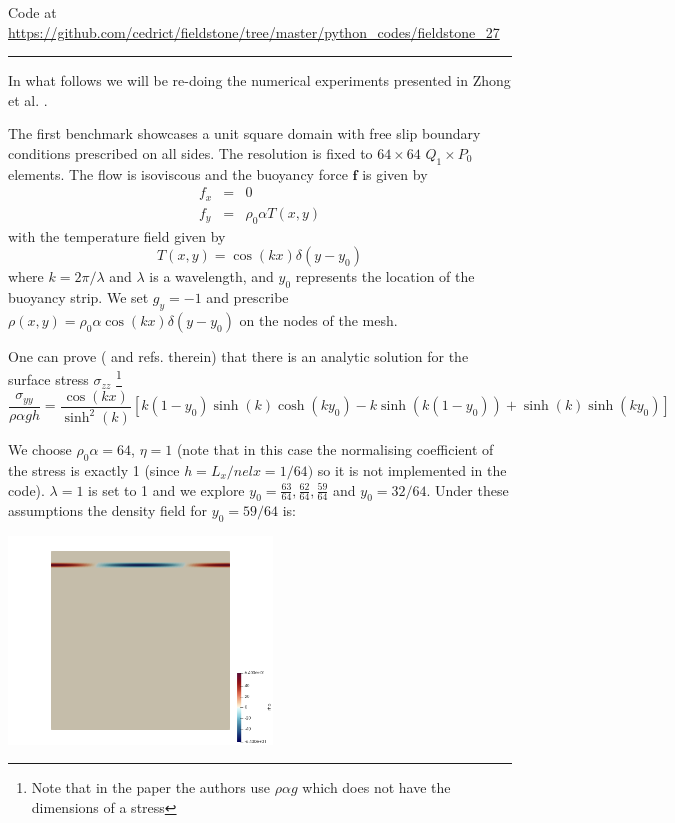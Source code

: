 

\begin{center}
Code at \url{https://github.com/cedrict/fieldstone/tree/master/python_codes/fieldstone_27}
\end{center}

\par\noindent\rule{\textwidth}{0.4pt}


In what follows we will be re-doing the numerical experiments presented in 
Zhong et al. \cite{zhgh93}.

The first benchmark showcases a unit square domain with free slip 
boundary conditions prescribed on all sides.
The resolution is fixed to $64\times64$ $Q_1 \times P_0$ elements. 
The flow is isoviscous and the buoyancy force ${\bm f}$ is given by 
\begin{eqnarray}
f_x &=& 0 \nonumber\\
f_y &=& \rho_0 \alpha T(x,y) \nonumber
\end{eqnarray}
with the temperature field given by 
\[
T(x,y) = \cos(kx) \delta(y-y_0)
\]
where $k=2\pi/\lambda$ and $\lambda$ is a wavelength, 
and $y_0$ represents the location of the buoyancy strip.
We set $g_y=-1$ and prescribe $\rho(x,y)=\rho_0 \alpha \cos(kx) \delta(y-y_0)$ on the nodes
of the mesh.

One can prove (\cite{zhgh93} and refs. therein) that 
there is an analytic solution for the surface stress $\sigma_{zz}$
\footnote{Note that in the paper the authors use $\rho \alpha g$ which does not have the 
dimensions of a stress}
\[
\frac{\sigma_{yy}}{\rho \alpha g h} =
\frac{\cos (kx)}{\sinh^2(k)}
\left[
k(1-y_0)\sinh(k) \cosh(ky_0)-k \sinh(k(1-y_0))
+\sinh(k) \sinh(ky_0)
\right]
\]

We choose $\rho_0 \alpha = 64$, $\eta=1$ (note that in this case the 
normalising coefficient of the stress is exactly 1 (since $h=L_x/nelx=1/64)$ so it is not implemented in the code).
$\lambda=1$ is set to 1 and we explore $y_0 = \frac{63}{64},\frac{62}{64},\frac{59}{64}$ and $y_0=32/64$.
Under these assumptions the density field for $y_0=59/64$ is:
\begin{center}
\includegraphics[width=7cm]{python_codes/fieldstone_27/rho}
\end{center}

